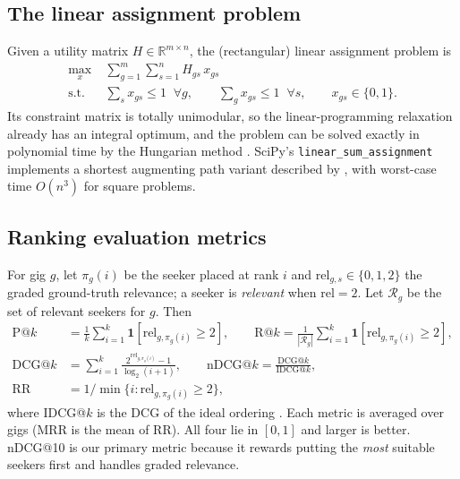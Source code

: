 \documentclass[12pt,a4paper]{article}
\numberwithin{equation}{section}
\theoremstyle{definition}
\theoremstyle{plain}
\newcommand{\R}{\mathbb{R}}
\newcommand{\rel}{\mathrm{rel}}
\begin{document}
\subsection{The linear assignment problem}
Given a utility matrix $H\in\R^{m\times n}$, the (rectangular) linear assignment problem is
\begin{equation}
\begin{aligned}
  \max_{x}\; & \sum_{g=1}^{m}\sum_{s=1}^{n} H_{gs}\,x_{gs}\\
  \text{s.t. }& \textstyle\sum_{s} x_{gs}\le 1 \;\;\forall g, \qquad \sum_{g} x_{gs}\le 1\;\;\forall s, \qquad x_{gs}\in\{0,1\}.
\end{aligned}
\label{eq:lap}
\end{equation}
Its constraint matrix is totally unimodular, so the linear-programming relaxation already has an integral optimum, and the problem can be solved exactly in polynomial time by the Hungarian method \citep{kuhn1955hungarian}. SciPy's \texttt{linear\_sum\_assignment} implements a shortest augmenting path variant described by \citet{crouse2016implementing}, with worst-case time $O(n^3)$ for square problems.

\subsection{Ranking evaluation metrics}
For gig $g$, let $\pi_g(i)$ be the seeker placed at rank $i$ and $\rel_{g,s}\in\{0,1,2\}$ the graded ground-truth relevance; a seeker is \emph{relevant} when $\rel= 2$. Let $\mathcal{R}_g$ be the set of relevant seekers for $g$. Then
\begin{align}
  \mathrm{P@}k &= \frac{1}{k}\sum_{i=1}^{k}\mathbf{1}[\rel_{g,\pi_g(i)}\ge 2], \qquad
  \mathrm{R@}k = \frac{1}{|\mathcal{R}_g|}\sum_{i=1}^{k}\mathbf{1}[\rel_{g,\pi_g(i)}\ge 2], \label{eq:pr}\\
  \mathrm{DCG@}k &= \sum_{i=1}^{k}\frac{2^{\rel_{g,\pi_g(i)}}-1}{\log_2(i+1)}, \qquad
  \mathrm{nDCG@}k = \frac{\mathrm{DCG@}k}{\mathrm{IDCG@}k}, \label{eq:ndcg}\\
  \mathrm{RR} &= 1/\min\{i:\rel_{g,\pi_g(i)}\ge 2\}, \label{eq:mrr}
\end{align}
where IDCG@$k$ is the DCG of the ideal ordering \citep{jarvelin2002cumulated}. Each metric is averaged over gigs (MRR is the mean of RR). All four lie in $[0,1]$ and larger is better. nDCG@10 is our primary metric because it rewards putting the \emph{most} suitable seekers first and handles graded relevance.
\end{document}
